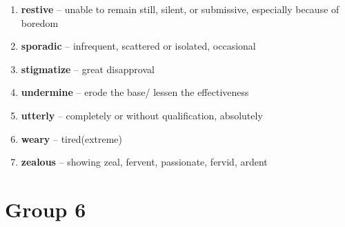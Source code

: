 \begin{enumerate}[wide,labelindent=0pt]
\item \textbf{restive} -- unable to remain still, silent, or submissive, especially because of boredom
\item \textbf{sporadic} -- infrequent, scattered or isolated, occasional
\item \textbf{stigmatize} -- great disapproval
\item \textbf{undermine} -- erode the base/ lessen the effectiveness
\item \textbf{utterly} -- completely or without qualification, absolutely
\item \textbf{weary} -- tired(extreme)
\item \textbf{zealous} -- showing zeal, fervent, passionate, fervid, ardent
\end{enumerate}

\newpage
\section{Group 6}

